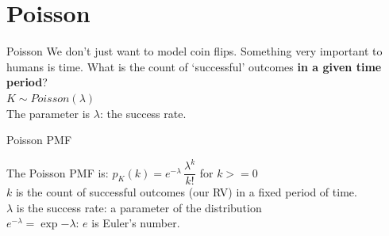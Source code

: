 \documentclass[10pt,sans,english,compress,xcolor=dvipsnames]{beamer}
\begin{document}
%
%
%
%
%
%
%
%
%
%
%
%
%
%



\section{Poisson}


\begin{frame}{Poisson}
We don't just want to model coin flips. Something very important to humans is time. What is the count of `successful' outcomes \textbf{in a given time period}?\\[1ex]

$K\sim Poisson(\lambda)$\\[1ex] 

The parameter is $\lambda$: the success rate.\\[1ex]


\end{frame} 


\begin{frame}{Poisson PMF}

The Poisson PMF is:  $p_K(k) =  e^{-\lambda}\, \dfrac{ \lambda^k}{k!}$   for $k>= 0$ \\[1ex]

$k$ is the count of successful outcomes (our RV) in a fixed period of time.\\[2ex]
$\lambda$ is the success rate: a parameter of the distribution\\[2ex]
$ e^{-\lambda} = \exp{-\lambda}$: $e$ is Euler's number.\\[2ex]

\end{frame} 
\end{document}
